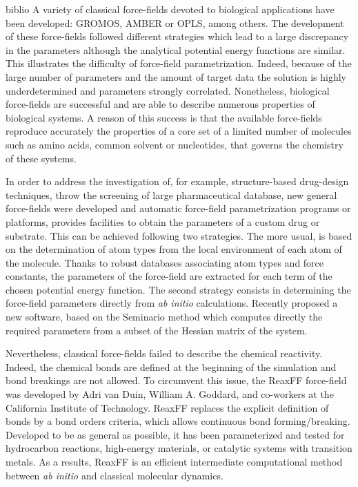 \documentclass[11pt]{artuppax}
\begin{document}
\begin{btSect}{biblio}
A variety of classical force-fields devoted to biological applications have been developed: GROMOS\cite{gromos}, AMBER\cite{amber} or OPLS\cite{opls1996}, among others. The development of these force-fields followed different strategies which lead to a large discrepancy in the parameters although the analytical potential energy functions are similar. This illustrates the difficulty of force-field parametrization. Indeed, because of the large number of parameters and the amount of target data the solution is highly underdetermined and parameters strongly correlated. Nonetheless, biological force-fields are successful and are able to describe numerous properties of biological systems. A reason of this success is that the available force-fields reproduce accurately the properties of a core set of a limited number of molecules such as amino acids, common solvent or nucleotides, that governs the chemistry of these systems.

In order to address the investigation of, for example, structure-based drug-design techniques, throw the screening of large pharmaceutical database, new general force-fields were developed\cite{gaff} and automatic force-field parametrization programs or platforms\cite{atb, prodrg}, provides facilities to obtain the parameters of a custom drug or substrate. This can be achieved following two strategies. The more usual, is based on the determination of atom types from the local environment of each atom of the molecule. Thanks to robust databases associating atom types and force constants, the parameters of the force-field are extracted for each term of the chosen potential energy function\cite{atb, prodrg}. The second strategy consists in determining the force-field parameters directly from \textit{ab initio} calculations. Recently \citet{zheng2016} proposed a new software, based on the Seminario method\cite{nilsson2003} which computes directly the required parameters from a subset of the Hessian matrix of the system.

Nevertheless, classical force-fields failed to describe the chemical reactivity. Indeed, the chemical bonds are defined at the beginning of the simulation and bond breakings are not allowed. To circumvent this issue, the ReaxFF force-field was developed by Adri van Duin, William A. Goddard, and co-workers at the California Institute of Technology\cite{reaxff2001}. ReaxFF replaces the explicit definition of bonds by a bond orders criteria, which allows continuous bond forming/breaking. Developed to be as general as possible, it has been parameterized and tested for hydrocarbon reactions, high-energy materials, or catalytic systems with transition metals. As a results, ReaxFF is an efficient intermediate computational method between \textit{ab initio} and classical molecular dynamics.


\end{btSect}
\end{document}
